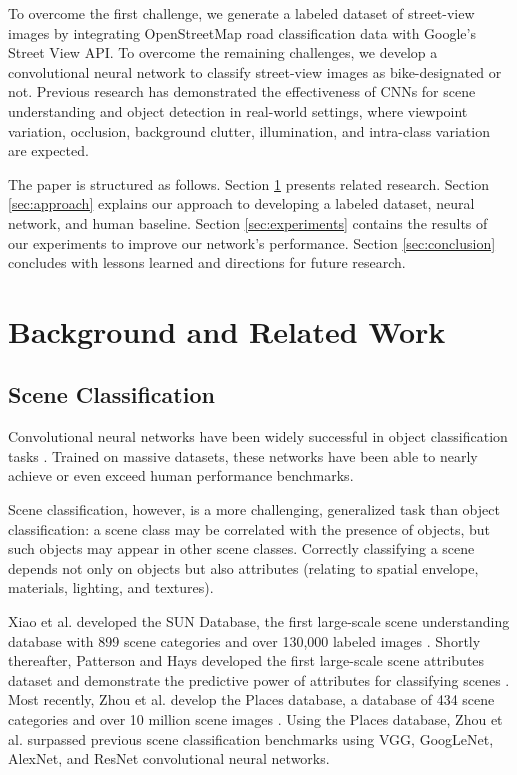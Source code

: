 \documentclass[10pt,twocolumn,letterpaper]{article}
\begin{document}
To overcome the first challenge, we generate a labeled dataset of street-view images by integrating OpenStreetMap road classification data with Google's Street View API. To overcome the remaining challenges, we develop a convolutional neural network to classify street-view images as bike-designated or not. Previous research has demonstrated the effectiveness of CNNs for scene understanding and object detection in real-world settings, where viewpoint variation, occlusion, background clutter, illumination, and intra-class variation are expected. 

The paper is structured as follows. Section \ref{sec:background} presents related research. Section \ref{sec:approach} explains our approach to developing a labeled dataset, neural network, and human baseline. Section \ref{sec:experiments} contains the results of our experiments to improve our network's performance. Section \ref{sec:conclusion} concludes with lessons learned and directions for future research.

\section{Background and Related Work}
\label{sec:background}

\subsection{Scene Classification}
Convolutional neural networks have been widely successful in object classification tasks \cite{krizhevsky2012imagenet}. Trained on massive datasets, these networks have been able to nearly achieve or even exceed human performance benchmarks.

Scene classification, however, is a more challenging, generalized task than object classification: a scene class may be correlated with the presence of objects, but such objects may appear in other scene classes. Correctly classifying a scene depends not only on objects but also attributes (relating to spatial envelope, materials, lighting, and textures).

Xiao et al. developed the SUN Database, the first large-scale scene understanding database with 899 scene categories and over 130,000 labeled images \cite{xiao2010sun}. Shortly thereafter, Patterson and Hays developed the first large-scale scene attributes dataset and demonstrate the predictive power of attributes for classifying scenes \cite{6247998}. Most recently, Zhou et al. develop the Places database, a database of 434 scene categories and over 10 million scene images \cite{DBLP:journals/corr/ZhouKLTO16}. Using the Places database, Zhou et al. surpassed previous scene classification benchmarks using VGG, GoogLeNet, AlexNet, and ResNet convolutional neural networks. 
\end{document}

